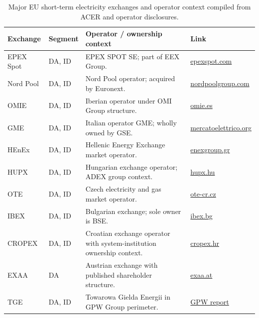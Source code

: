 \documentclass[oneside,10pt]{swissi}
\begin{document}
\begin{table}[htbp]
\centering
\caption{Major EU short-term electricity exchanges and operator context compiled from ACER and operator disclosures.}
\label{tab:exchange-matrix}
\footnotesize
\setlength{\tabcolsep}{4pt}
\renewcommand{\arraystretch}{1.12}
\begin{tabularx}{\textwidth}{p{1.8cm} p{1.7cm} X p{2.6cm}}
\toprule
Exchange & Segment & Operator / ownership context & Link \\
\midrule
EPEX Spot & DA, ID & EPEX SPOT SE; part of EEX Group.\cite{epex_company_information_2026} & \href{https://www.epexspot.com/en/company-information}{epexspot.com} \\
Nord Pool & DA, ID & Nord Pool operator; acquired by Euronext.\cite{nord_pool_about_2026} & \href{https://www.nordpoolgroup.com/en/about-us/}{nordpoolgroup.com} \\
OMIE & DA, ID & Iberian operator under OMI Group structure.\cite{omie_about_2026,omi_group_faq_ownership_2026} & \href{https://www.omie.es/en/about-us}{omie.es} \\
GME & DA, ID & Italian operator GME; wholly owned by GSE.\cite{gme_organization_2026} & \href{https://www.mercatoelettrico.org/en-us/Home/Aboutus/Organization}{mercatoelettrico.org} \\
HEnEx & DA, ID & Hellenic Energy Exchange market operator.\cite{henex_company_profile_2026} & \href{https://www.enexgroup.gr/web/guest/company-profile}{enexgroup.gr} \\
HUPX & DA, ID & Hungarian exchange operator; ADEX group context.\cite{hupx_about_2026,adex_group_about_2026} & \href{https://hupx.hu/about}{hupx.hu} \\
OTE & DA, ID & Czech electricity and gas market operator.\cite{ote_basic_facts_2026} & \href{https://www.ote-cr.cz/en/basic-facts}{ote-cr.cz} \\
IBEX & DA, ID & Bulgarian exchange; sole owner is BSE.\cite{ibex_profile_2026} & \href{https://ibex.bg/en/profile.html}{ibex.bg} \\
CROPEX & DA, ID & Croatian exchange operator with system-institution ownership context.\cite{cropex_about_2026} & \href{https://www.cropex.hr/en/about-us}{cropex.hr} \\
EXAA & DA & Austrian exchange with published shareholder structure.\cite{exaa_about_2026} & \href{https://www.exaa.at/en/about-exaa/}{exaa.at} \\
TGE & DA, ID & Towarowa Gielda Energii in GPW Group perimeter.\cite{gpw_h1_2025_tge_ownership_2025} & \href{https://pap-mediaroom.pl/sites/default/files/2025-09/GPW_Group_H1_2025_Consolidated_Financial_Report.pdf}{GPW report} \\

\end{tabularx}
\end{table}
\end{document}
